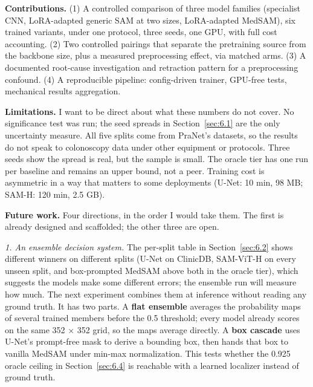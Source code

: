 \documentclass[conference]{IEEEtran}
\begin{document}
\textbf{Contributions.} (1) A controlled comparison of three model families (specialist CNN, LoRA-adapted generic SAM at two sizes, LoRA-adapted MedSAM), six trained variants, under one protocol, three seeds, one GPU, with full cost accounting. (2) Two controlled pairings that separate the pretraining source from the backbone size, plus a measured preprocessing effect, via matched arms. (3) A documented root-cause investigation and retraction pattern for a preprocessing confound. (4) A reproducible pipeline: config-driven trainer, GPU-free tests, mechanical results aggregation.

\textbf{Limitations.} I want to be direct about what these numbers do not cover. No significance test was run; the seed spreads in Section~\ref{sec:6.1} are the only uncertainty measure. All five splits come from PraNet's datasets, so the results do not speak to colonoscopy data under other equipment or protocols. Three seeds show the spread is real, but the sample is small. The oracle tier has one run per baseline and remains an upper bound, not a peer. Training cost is asymmetric in a way that matters to some deployments (U-Net: 10 min, 98 MB; SAM-H: 120 min, 2.5 GB).

\textbf{Future work.} Four directions, in the order I would take them. The first is already designed and scaffolded; the other three are open.

\textit{1. An ensemble decision system.} The per-split table in Section~\ref{sec:6.2} shows different winners on different splits (U-Net on ClinicDB, SAM-ViT-H on every unseen split, and box-prompted MedSAM above both in the oracle tier), which suggests the models make some different errors; the ensemble run will measure how much. The next experiment combines them at inference without reading any ground truth. It has two parts. A \textbf{flat ensemble} averages the probability maps of several trained members before the 0.5 threshold; every model already scores on the same 352 $\times$ 352 grid, so the maps average directly. A \textbf{box cascade} uses U-Net's prompt-free mask to derive a bounding box, then hands that box to vanilla MedSAM under min-max normalization. This tests whether the 0.925 oracle ceiling in Section~\ref{sec:6.4} is reachable with a learned localizer instead of ground truth.
\end{document}
